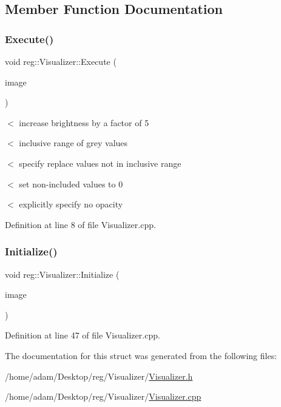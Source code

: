 \subsection{Member Function Documentation}
\mbox{\label{structreg_1_1_visualizer_aad11952fc8c47d0f208620a690ce4985}} 
\subsubsection{\texorpdfstring{Execute()}{Execute()}}
{\footnotesize\ttfamily void reg\+::\+Visualizer\+::\+Execute (\begin{DoxyParamCaption}\item[{vtk\+Image\+Data $\ast$}]{image }\end{DoxyParamCaption})}

$<$ increase brightness by a factor of 5

$<$ inclusive range of grey values

$<$ specify replace values not in inclusive range

$<$ set non-\/included values to 0

$<$ explicitly specify no opacity 

Definition at line 8 of file Visualizer.\+cpp.

\mbox{\label{structreg_1_1_visualizer_a43f723595f4d7c1043cc13997aa9046b}} 
\subsubsection{\texorpdfstring{Initialize()}{Initialize()}}
{\footnotesize\ttfamily void reg\+::\+Visualizer\+::\+Initialize (\begin{DoxyParamCaption}\item[{vtk\+Image\+Data $\ast$}]{image }\end{DoxyParamCaption})}



Definition at line 47 of file Visualizer.\+cpp.



The documentation for this struct was generated from the following files\+:\begin{DoxyCompactItemize}
\item 
/home/adam/\+Desktop/reg/\+Visualizer/\hyperlink{_visualizer_8h}{Visualizer.\+h}\item 
/home/adam/\+Desktop/reg/\+Visualizer/\hyperlink{_visualizer_8cpp}{Visualizer.\+cpp}\end{DoxyCompactItemize}
